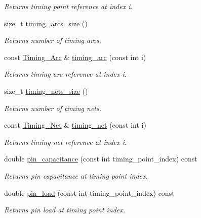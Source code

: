 \begin{DoxyCompactItemize}
\begin{DoxyCompactList}\small\item\em Returns timing point reference at index i. \end{DoxyCompactList}\item 
size\-\_\-t \hyperlink{classTiming__Analysis_1_1Timing__Analysis_a239195867157ea06264afcdc3bb54e53}{timing\-\_\-arcs\-\_\-size} ()
\begin{DoxyCompactList}\small\item\em Returns number of timing arcs. \end{DoxyCompactList}\item 
const \hyperlink{classTiming__Analysis_1_1Timing__Arc}{Timing\-\_\-\-Arc} \& \hyperlink{classTiming__Analysis_1_1Timing__Analysis_ab51fd160e68b13a059efdcc460da1e83}{timing\-\_\-arc} (const int i)
\begin{DoxyCompactList}\small\item\em Returns timing arc reference at index i. \end{DoxyCompactList}\item 
size\-\_\-t \hyperlink{classTiming__Analysis_1_1Timing__Analysis_a0d0a28110de2017c754373f7a73c160d}{timing\-\_\-nets\-\_\-size} ()
\begin{DoxyCompactList}\small\item\em Returns number of timing nets. \end{DoxyCompactList}\item 
const \hyperlink{classTiming__Analysis_1_1Timing__Net}{Timing\-\_\-\-Net} \& \hyperlink{classTiming__Analysis_1_1Timing__Analysis_ab113f7930936110307c215a90e410769}{timing\-\_\-net} (const int i)
\begin{DoxyCompactList}\small\item\em Returns timing net reference at index i. \end{DoxyCompactList}\item 
double \hyperlink{classTiming__Analysis_1_1Timing__Analysis_a0263a18b53ef152589a3396423490f78}{pin\-\_\-capacitance} (const int timing\-\_\-point\-\_\-index) const 
\begin{DoxyCompactList}\small\item\em Returns pin capacitance at timing point index. \end{DoxyCompactList}\item 
double \hyperlink{classTiming__Analysis_1_1Timing__Analysis_a6569529b1614d4507d48293c7ea9f544}{pin\-\_\-load} (const int timing\-\_\-point\-\_\-index) const 
\begin{DoxyCompactList}\small\item\em Returns pin load at timing point index. \end{DoxyCompactList}\item 

\end{DoxyCompactItemize}
